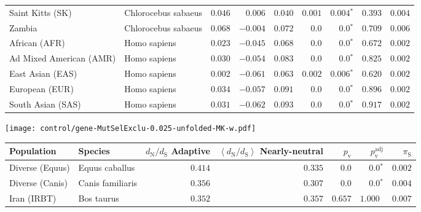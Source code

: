 \begin{center}
\begin{adjustbox}{width = 1\textwidth}
\begin{tabular}{|l|l|r|r|r|r|r|r|r|}
            Saint Kitts (SK)                  & Chlorocebus sabaeus        & $ 0.046$ & $ 0.006$  & $ 0.040$ & $ 0.001$    & $\bm{ 0.004{^*}}$    & $ 0.393$ & $ 0.004$ \\
            Zambia        & Chlorocebus sabaeus        & $ 0.068$ & $-0.004$  & $ 0.072$ & $0.0$    & $\bm{0.0{^*}}$ & $ 0.709$ & $ 0.006$ \\
            African (AFR)               & Homo sapiens        & $ 0.023$ & $-0.045$  & $ 0.068$ & $0.0$ & $\bm{0.0{^*}}$ & $ 0.672$ & $ 0.002$ \\
            Ad Mixed American (AMR)                 & Homo sapiens        & $ 0.030$ & $-0.054$  & $ 0.083$ & $0.0$    & $\bm{0.0{^*}}$    & $ 0.825$ & $ 0.002$ \\
            East Asian (EAS)              & Homo sapiens        & $ 0.002$ & $-0.061$  & $ 0.063$ & $ 0.002$    & $\bm{ 0.006{^*}}$    & $ 0.620$ & $ 0.002$ \\
            European (EUR)              & Homo sapiens        & $ 0.034$ & $-0.057$  & $ 0.091$ & $0.0$    & $\bm{0.0{^*}}$    & $ 0.896$ & $ 0.002$ \\
            South Asian (SAS)              & Homo sapiens        & $ 0.031$ & $-0.062$  & $ 0.093$ & $0.0$    & $\bm{0.0{^*}}$    & $ 0.917$ & $ 0.002$ \\
            \bottomrule
        \end{tabular}
    \end{adjustbox}
    \newpage
    \texttt{[image: control/gene-MutSelExclu-0.025-unfolded-MK-w.pdf]}
    \begin{adjustbox}{width = 1\textwidth}
        \begin{tabular}{|l|l|r|r|r|r|r|}
            \toprule
            Population & Species & \specialcell{$d_{\mathrm{N}} / d_{\mathrm{S}}$ \\ Adaptive}                & \specialcell{$\left< d_{\mathrm{N}} / d_{\mathrm{S}} \right>$ \\ Nearly-neutral}                & $p_{\mathrm{v}}$    & $p_{\mathrm{v}}^{\mathrm{adj}}$ & $\pi_{\textrm{S}}$ \\
            \midrule
            Diverse (Equus)                    & Equus caballus          & $ 0.414$ & $ 0.335$ & $0.0$ & $\bm{0.0{^*}}$        & $ 0.002$ \\
            Diverse (Canis)                  & Canis familiaris          & $ 0.356$ & $ 0.307$ & $0.0$ & $\bm{0.0{^*}}$        & $ 0.004$ \\
            Iran (IRBT)               & Bos taurus        & $ 0.352$ & $ 0.357$ & $ 0.657$ & $ 1.000~~$        & $ 0.007$ \\

\end{tabular}
\end{adjustbox}
\end{center}
